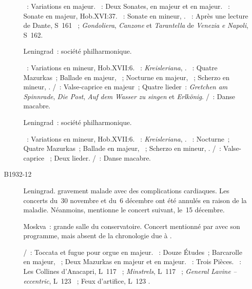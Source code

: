 \begin{description}
 \textsc{\Haendel{}}~: Variations en \kE majeur.
 \textsc{\Scarlatti{}}~: Deux Sonates, en \kA majeur et en \kD majeur.
 \textsc{\Haydn{}}~: Sonate en \kD majeur, Hob.XVI:37.
 \textsc{\Chopin{}}~: Sonate en \kB mineur, .
 \textsc{\Liszt{}}~: Après une lecture de Dante, S~161 ~;
 \emph{Gondoliera}, \emph{Canzone} et \emph{Tarantella} de \emph{Venezia e
 Napoli}, S~162.
 \item[\DateWithWeekDay{1932-10-24}]
 Leningrad~: société philharmonique.

 \textsc{\Haydn{}}~: Variations en \kF mineur, Hob.XVII:6.
 \textsc{\Schumann{}}~: \emph{Kreisleriana}, .
 \textsc{\Chopin{}}~: Quatre Mazurkas~; Ballade en \kA \Flat majeur,
 ~; Nocturne en \kF majeur,  ~; Scherzo en \kC
 \Sharp mineur, .
 \textsc{\Schubert{}/\Liszt{}}~: Valse-caprice en \kA majeur~; Quatre
 lieder~: \emph{Gretchen am Spinnrade}, \emph{Die Post}, \emph{Auf dem
 Wasser zu singen} et \emph{Erlkönig}.
 \textsc{\SaintSaens{}/\Liszt{}}~: Danse macabre.
 \item[\DateWithWeekDay{1932-11-24}]
 Leningrad~: société philharmonique.

 \textsc{\Haydn{}}~: Variations en \kF mineur, Hob.XVII:6.
 \textsc{\Schumann{}}~: \emph{Kreisleriana}, .
 \textsc{\Chopin{}}~: Nocturne~; Quatre Mazurkas~; Ballade en \kA \Flat
 majeur, ~; Scherzo en \kC \Sharp mineur, .
 \textsc{\Schubert{}/\Liszt{}}~: Valse-caprice ~; Deux lieder.
 \textsc{\SaintSaens{}/\Liszt{}}~: Danse macabre.
 \item[B1932-12]
 Leningrad.
 \VSofronitsky{} gravement malade avec des complications cardiaques.
 Les concerts du~30 novembre et du~6 décembre ont été annulés en raison de
 la maladie.
 Néanmoins, \citet[p.~155]{Nekrasova08} mentionne le concert suivant, le~15
 décembre.
 \item[\DateWithWeekDay{1932-12-15}]
 Moskva~: grande salle du conservatoire.
 Concert mentionné par \citet[p.~155]{Nekrasova08} avec son programme, mais
 absent de la chronologie due à \citet[p.~405]{Scriabine}.

 \textsc{\JBach{}/\Busoni{}}~: Toccata et fugue pour orgue en \kC majeur.
 \textsc{\Chopin{}}~: Douze Études~; Barcarolle en \kF \Sharp majeur,
 ~; Deux Mazurkas en \kD majeur et en \kB majeur.
 \textsc{\Prokofiev{}}~: Trois Pièces.
 \textsc{\Debussy{}}~: Les Collines d'\hbox{Anacapri}, L~117 ~;
 \emph{Minstrels}, L~117 ~; \emph{General Lavine -- eccentric},
 L~123 ~; Feux d'artifice, L~123 .
\end{description}

